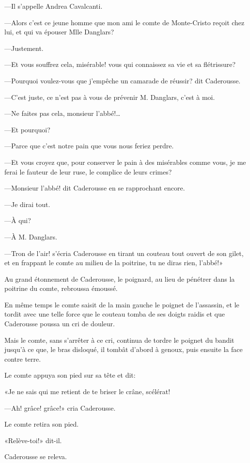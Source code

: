—Il s'appelle Andrea Cavalcanti. 

—Alors c'est ce jeune homme que mon ami le comte de Monte-Cristo reçoit chez lui, et qui va épouser Mlle Danglars? 

—Justement. 

—Et vous souffrez cela, misérable! vous qui connaissez sa vie et sa flétrissure? 

—Pourquoi voulez-vous que j'empêche un camarade de réussir? dit Caderousse. 

—C'est juste, ce n'est pas à vous de prévenir M. Danglars, c'est à moi. 

—Ne faites pas cela, monsieur l'abbé!\dots 

—Et pourquoi? 

—Parce que c'est notre pain que vous nous feriez perdre. 

—Et vous croyez que, pour conserver le pain à des misérables comme vous, je me ferai le fauteur de leur ruse, le complice de leurs crimes? 

—Monsieur l'abbé! dit Caderousse en se rapprochant encore. 

—Je dirai tout. 

—À qui? 

—À M. Danglars. 

—Tron de l'air! s'écria Caderousse en tirant un couteau tout ouvert de son gilet, et en frappant le comte au milieu de la poitrine, tu ne diras rien, l'abbé!» 

Au grand étonnement de Caderousse, le poignard, au lieu de pénétrer dans la poitrine du comte, rebroussa émoussé. 

En même temps le comte saisit de la main gauche le poignet de l'assassin, et le tordit avec une telle force que le couteau tomba de ses doigts raidis et que Caderousse poussa un cri de douleur. 

Mais le comte, sans s'arrêter à ce cri, continua de tordre le poignet du bandit jusqu'à ce que, le bras disloqué, il tombât d'abord à genoux, puis ensuite la face contre terre. 

Le comte appuya son pied sur sa tête et dit: 

«Je ne sais qui me retient de te briser le crâne, scélérat! 

—Ah! grâce! grâce!» cria Caderousse. 

Le comte retira son pied. 

«Relève-toi!» dit-il. 

Caderousse se releva. 

